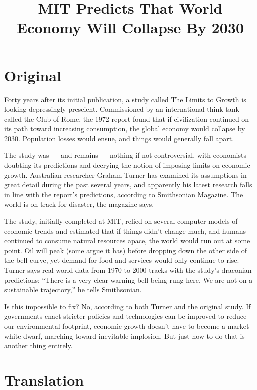\documentclass[a4paper,11pt]{article}
\title{MIT Predicts That World Economy Will Collapse By 2030}
\author{}
\date{}
\begin{document}
\begin{multicols}{2}
	\maketitle

\section{Original}

Forty years after its initial publication, a study called The Limits to Growth is looking depressingly prescient.
Commissioned by an international think tank called the Club of Rome, the 1972 report found that if civilization
continued on its path toward increasing consumption, the global economy would collapse by 2030. Population losses would
ensue, and things would generally fall apart.

The study was — and remains — nothing if not controversial, with economists doubting its predictions and decrying the
notion of imposing limits on economic growth. Australian researcher Graham Turner has examined its assumptions in great
detail during the past several years, and apparently his latest research falls in line with the report’s predictions,
according to Smithsonian Magazine. The world is on track for disaster, the magazine says.

The study, initially completed at MIT, relied on several computer models of economic trends and estimated that if things
didn’t change much, and humans continued to consume natural resources apace, the world would run out at some point. Oil
will peak (some argue it has) before dropping down the other side of the bell curve, yet demand for food and services
would only continue to rise. Turner says real-world data from 1970 to 2000 tracks with the study’s draconian
predictions: “There is a very clear warning bell being rung here. We are not on a sustainable trajectory,” he tells
Smithsonian.

Is this impossible to fix? No, according to both Turner and the original study. If governments enact stricter policies
and technologies can be improved to reduce our environmental footprint, economic growth doesn’t have to become a market
white dwarf, marching toward inevitable implosion. But just how to do that is another thing entirely.

\columnbreak
\section{Translation}



\end{multicols}
\end{document}
